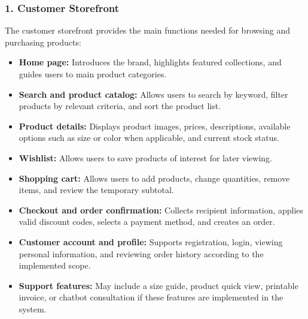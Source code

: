 \documentclass[12pt,a4paper,oneside]{report}
\begin{document}
\subsubsection{1. Customer Storefront}
The customer storefront provides the main functions needed for browsing and purchasing products:
\begin{itemize}[leftmargin=1.2cm]
    \item \textbf{Home page:} Introduces the brand, highlights featured collections, and guides users to main product categories.
    \item \textbf{Search and product catalog:} Allows users to search by keyword, filter products by relevant criteria, and sort the product list.
    \item \textbf{Product details:} Displays product images, prices, descriptions, available options such as size or color when applicable, and current stock status.
    \item \textbf{Wishlist:} Allows users to save products of interest for later viewing.
    \item \textbf{Shopping cart:} Allows users to add products, change quantities, remove items, and review the temporary subtotal.
    \item \textbf{Checkout and order confirmation:} Collects recipient information, applies valid discount codes, selects a payment method, and creates an order.
    \item \textbf{Customer account and profile:} Supports registration, login, viewing personal information, and reviewing order history according to the implemented scope.
    \item \textbf{Support features:} May include a size guide, product quick view, printable invoice, or chatbot consultation if these features are implemented in the system.
\end{itemize}
\end{document}
